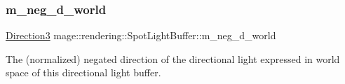 \subsubsection{\texorpdfstring{m\+\_\+neg\+\_\+d\+\_\+world}{m\_neg\_d\_world}}
{\footnotesize\ttfamily \mbox{\hyperlink{structmage_1_1_direction3}{Direction3}} mage\+::rendering\+::\+Spot\+Light\+Buffer\+::m\+\_\+neg\+\_\+d\+\_\+world}

The (normalized) negated direction of the directional light expressed in world space of this directional light buffer. 
